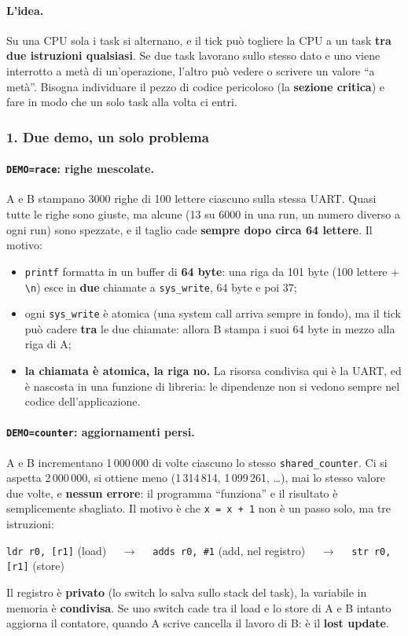 \paragraph*{L'idea.} Su una CPU sola i task si alternano, e il tick può togliere la CPU a un task \textbf{tra due istruzioni qualsiasi}. Se due task lavorano sullo stesso dato e uno viene interrotto a metà di un'operazione, l'altro può vedere o scrivere un valore ``a metà''. Bisogna individuare il pezzo di codice pericoloso (la \textbf{sezione critica}) e fare in modo che un solo task alla volta ci entri.

\subsubsection*{1. Due demo, un solo problema}
\paragraph*{\texttt{DEMO=race}: righe mescolate.} A e B stampano 3000 righe di 100 lettere ciascuno sulla stessa UART. Quasi tutte le righe sono giuste, ma alcune (13 su 6000 in una run, un numero diverso a ogni run) sono spezzate, e il taglio cade \textbf{sempre dopo circa 64 lettere}. Il motivo:
\begin{itemize}
    \item \texttt{printf} formatta in un buffer di \textbf{64 byte}: una riga da 101 byte (100 lettere + \texttt{\textbackslash n}) esce in \textbf{due} chiamate a \texttt{sys\_write}, 64 byte e poi 37;
    \item ogni \texttt{sys\_write} è atomica (una system call arriva sempre in fondo), ma il tick può cadere \textbf{tra} le due chiamate: allora B stampa i suoi 64 byte in mezzo alla riga di A;
    \item \textbf{la chiamata è atomica, la riga no.} La risorsa condivisa qui è la UART, ed è nascosta in una funzione di libreria: le dipendenze non si vedono sempre nel codice dell'applicazione.
\end{itemize}

\paragraph*{\texttt{DEMO=counter}: aggiornamenti persi.} A e B incrementano 1\,000\,000 di volte ciascuno lo stesso \texttt{shared\_counter}. Ci si aspetta 2\,000\,000, si ottiene meno (1\,314\,814, 1\,099\,261, \dots), mai lo stesso valore due volte, e \textbf{nessun errore}: il programma ``funziona'' e il risultato è semplicemente sbagliato. Il motivo è che \texttt{x = x + 1} non è un passo solo, ma tre istruzioni:
\begin{center}
\texttt{ldr r0, [r1]} (load) $\quad\to\quad$ \texttt{adds r0, \#1} (add, nel registro) $\quad\to\quad$ \texttt{str r0, [r1]} (store)
\end{center}
Il registro è \textbf{privato} (lo switch lo salva sullo stack del task), la variabile in memoria è \textbf{condivisa}. Se uno switch cade tra il load e lo store di A e B intanto aggiorna il contatore, quando A scrive cancella il lavoro di B: è il \textbf{lost update}.

